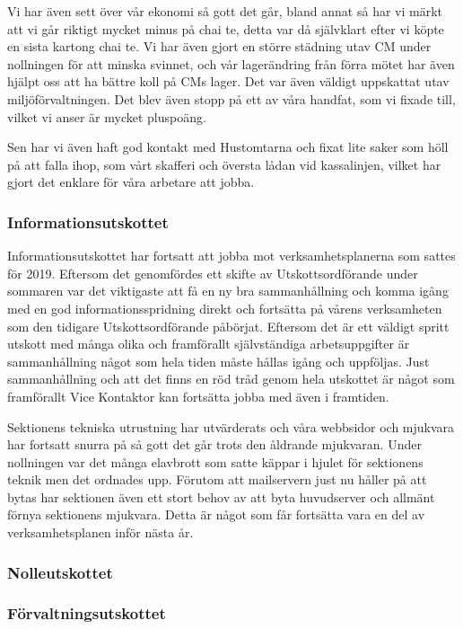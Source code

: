 \documentclass[../_main/handlingar.tex]{subfiles}
\begin{document}
Vi har även sett över vår ekonomi så gott det går, bland annat så har vi märkt att vi går riktigt mycket minus på chai te, detta var då självklart efter vi köpte en sista kartong chai te. Vi har även gjort en större städning utav CM under nollningen för att minska svinnet, och vår lagerändring från förra mötet har även hjälpt oss att ha bättre koll på CMs lager. Det var även väldigt uppskattat utav miljöförvaltningen. Det blev även stopp på ett av våra handfat, som vi fixade till, vilket vi anser är mycket pluspoäng. 

Sen har vi även haft god kontakt med Hustomtarna och fixat lite saker som höll på att falla ihop, som vårt skafferi och översta lådan vid kassalinjen, vilket har gjort det enklare för våra arbetare att jobba.

\subsubsection*{Informationsutskottet}

Informationsutskottet har fortsatt att jobba mot verksamhetsplanerna som sattes för 2019. Eftersom det genomfördes ett skifte av Utskottsordförande under sommaren var det viktigaste att få en ny bra sammanhållning och komma igång med en god informationsspridning direkt och fortsätta på vårens verksamheten som den tidigare Utskottsordförande påbörjat. Eftersom det är ett väldigt spritt utskott med många olika och framförallt självständiga arbetsuppgifter är sammanhållning något som hela tiden måste hållas igång och uppföljas. Just sammanhållning och att det finns en röd tråd genom hela utskottet är något som framförallt Vice Kontaktor kan fortsätta jobba med även i framtiden. 

Sektionens tekniska utrustning har utvärderats och våra webbsidor och mjukvara har fortsatt snurra på så gott det går trots den åldrande mjukvaran. Under nollningen var det många elavbrott som satte käppar i hjulet för sektionens teknik men det ordnades upp. Förutom att mailservern just nu håller på att bytas har sektionen även ett stort behov av att byta huvudserver och allmänt förnya sektionens mjukvara. Detta är något som får fortsätta vara en del av verksamhetsplanen inför nästa år.

\subsubsection*{Nolleutskottet}

\subsubsection*{Förvaltningsutskottet}
\end{document}
